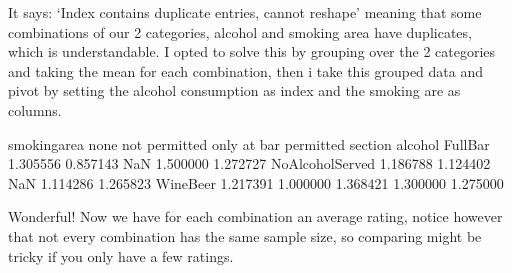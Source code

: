 \documentclass[letterpaper,10pt,english]{jupyterBook}
\begin{document}
\sphinxAtStartPar
It says: ‘Index contains duplicate entries, cannot reshape’ meaning that some combinations of our 2 categories, alcohol and smoking area have duplicates, which is understandable.
I opted to solve this by grouping over the 2 categories and taking the mean for each combination, then i take this grouped data and pivot by setting the alcohol consumption as index and the smoking are as columns.

\begin{sphinxVerbatim}[commandchars=\\\{\}]
  \PYG{p}{[}\PYG{p}{]}\PYG{p}{[}\PYG{p}{[} \PYG{p}{]}\PYG{p}{]}
  
\end{sphinxVerbatim}

\begin{sphinxVerbatim}[commandchars=\\\{\}]
smoking\PYGZus{}area           none  not permitted  only at bar  permitted   section
alcohol                                                                     
Full\PYGZus{}Bar           1.305556       0.857143          NaN   1.500000  1.272727
No\PYGZus{}Alcohol\PYGZus{}Served  1.186788       1.124402          NaN   1.114286  1.265823
Wine\PYGZhy{}Beer          1.217391       1.000000     1.368421   1.300000  1.275000
\end{sphinxVerbatim}

\sphinxAtStartPar
Wonderful! Now we have for each combination an average rating, notice however that not every combination has the same sample size, so comparing might be tricky if you only have a few ratings.
\end{document}
